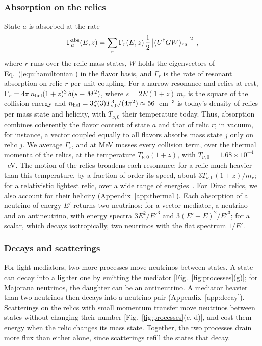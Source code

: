 \documentclass[linenumbers, aps, prd, twocolumn, superscriptaddress, floatfix, longbibliography, nofootinbib, bibnotes]{revtex4-2}
\begin{document}
\subsubsection{Absorption on the relics}
State $a$ is absorbed at the rate
\begin{equation}
 \label{equ:absorption}
 \Gamma^{\rm abs}_a(E, z) = \sum_r \Gamma_r(E, z)\, \frac{1}{2} \left| (U^\dagger G W)_{ra} \right|^2 \;,
\end{equation}
where $r$ runs over the relic mass states, $W$ holds the eigenvectors of Eq.~(\ref{equ:hamiltonian}) in the flavor basis, and $\Gamma_r$ is the rate of resonant absorption on relic $r$ per unit coupling.
For a narrow resonance and relics at rest, $\Gamma_r = 4\pi\, n_{\rm hel} (1+z)^3\, \delta(s - M^2)$, where $s = 2E(1+z)\, m_r$ is the square of the collision energy and $n_{\rm hel} = 3\zeta(3) T_{\nu,0}^3/(4\pi^2) \approx 56$~cm$^{-3}$ is today's density of relics per mass state and helicity, with $T_{\nu,0}$ their temperature today.
Thus, absorption combines coherently the flavor content of state $a$ and that of relic $r$; in vacuum, for instance, a vector coupled equally to all flavors absorbs mass state $j$ only on relic $j$.
We average $\Gamma_r$, and at MeV masses every collision term, over the thermal momenta of the relics, at the temperature $T_{\nu,0}(1+z)$, with $T_{\nu,0} = 1.68 \times 10^{-4}$~eV.
The motion of the relics broadens each resonance: for a relic much heavier than this temperature, by a fraction of order its speed, about $3T_{\nu,0}(1+z)/m_r$; for a relativistic lightest relic, over a wide range of energies~\cite{Doring:2023vmk, Wang:2025qap}.
For Dirac relics, we also account for their helicity (Appendix~\ref{app:thermal}).
Each absorption of a neutrino of energy $E'$ returns two neutrinos: for a vector mediator, a neutrino and an antineutrino, with energy spectra $3E^2/E'^3$ and $3(E' - E)^2/E'^3$; for a scalar, which decays isotropically, two neutrinos with the flat spectrum $1/E'$.

\subsubsection{Decays and scatterings}
For light mediators, two more processes move neutrinos between states.
A state can decay into a lighter one by emitting the mediator [Fig.~\ref{fig:processes}(g)]; for Majorana neutrinos, the daughter can be an antineutrino.
A mediator heavier than two neutrinos then decays into a neutrino pair (Appendix~\ref{app:decay}).
Scatterings on the relics with small momentum transfer move neutrinos between states without changing their number [Fig.~\ref{fig:processes}(c, d)], and cost them energy when the relic changes its mass state.
Together, the two processes drain more flux than either alone, since scatterings refill the states that decay.
\end{document}
